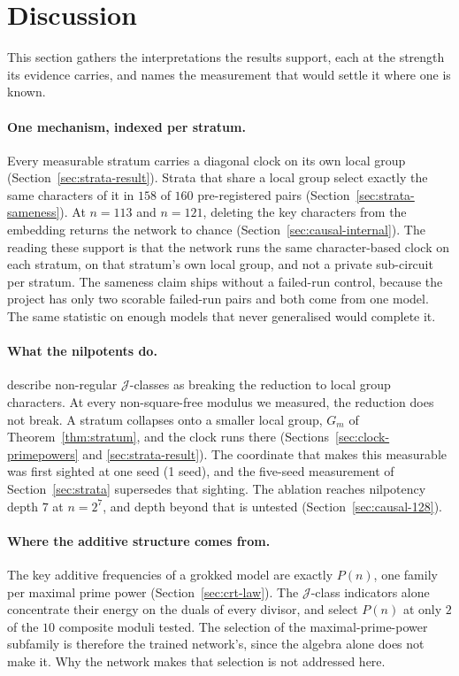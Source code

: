 \section{Discussion}
\label{sec:discussion}

This section gathers the interpretations the results support, each at the strength its
evidence carries, and names the measurement that would settle it where one is known.

\paragraph{One mechanism, indexed per stratum.} Every measurable stratum carries a diagonal
clock on its own local group (Section~\ref{sec:strata-result}). Strata that share a local
group select exactly the same characters of it in $158$ of $160$ pre-registered pairs
(Section~\ref{sec:strata-sameness}). At $n = 113$ and $n = 121$, deleting the key characters
from the embedding returns the network to chance (Section~\ref{sec:causal-internal}). The
reading these support is that the network runs the same character-based clock on each
stratum, on that stratum's own local group, and not a private sub-circuit per stratum. The
sameness claim ships without a failed-run control, because the project has only two scorable
failed-run pairs and both come from one model. The same statistic on enough models that never
generalised would complete it.

\paragraph{What the nilpotents do.} \citet{chen2026multiplication} describe non-regular
$\mathcal{J}$-classes as breaking the reduction to local group characters. At every
non-square-free modulus we measured, the reduction does not break. A stratum collapses onto a
smaller local group, $G_{m}$ of Theorem~\ref{thm:stratum}, and the clock runs there
(Sections~\ref{sec:clock-primepowers} and \ref{sec:strata-result}). The coordinate that makes
this measurable was first sighted at one seed (1 seed), and the five-seed measurement of
Section~\ref{sec:strata} supersedes that sighting. The ablation reaches nilpotency depth $7$
at $n = 2^{7}$, and depth beyond that is untested (Section~\ref{sec:causal-128}).

\paragraph{Where the additive structure comes from.} The key additive frequencies of a
grokked model are exactly $P(n)$, one family per maximal prime power
(Section~\ref{sec:crt-law}). The $\mathcal{J}$-class indicators alone concentrate their
energy on the duals of every divisor, and select $P(n)$ at only $2$ of the $10$ composite
moduli tested. The selection of the maximal-prime-power subfamily
is therefore the trained network's, since the algebra alone does not make it. Why the network
makes that selection is not addressed here.

